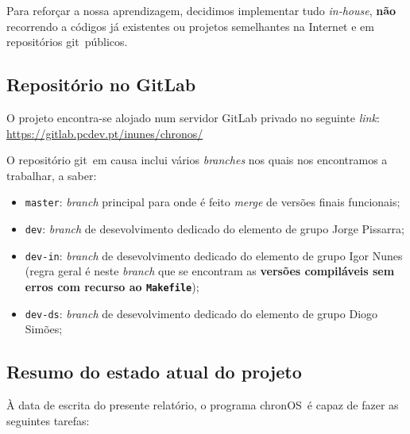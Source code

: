 \documentclass[a4paper,11pt,onecolumn,oneside]{article}
\newcommand{\chronOS}{\textsf{chronOS}}
\newcommand{\git}{\textsf{git}}
\begin{document}
	Para reforçar a nossa aprendizagem, decidimos implementar tudo \textit{in-house}, \textbf{não} recorrendo a códigos já existentes ou projetos semelhantes na Internet e em repositórios \git~públicos.
	
	
	\subsection{Repositório no GitLab}
	\label{ssec:dev:gitlab}
	
	O projeto encontra-se alojado num servidor GitLab privado no seguinte \textit{link}: \url{https://gitlab.pcdev.pt/inunes/chronos/}
	
	O repositório \git~em causa inclui vários \textit{branches} nos quais nos encontramos a trabalhar, a saber:
	
	\begin{itemize}
		\item \texttt{master}: \textit{branch} principal para onde é feito \textit{merge} de versões finais funcionais;
		\item \texttt{dev}: \textit{branch} de desevolvimento dedicado do elemento de grupo Jorge Pissarra;
		\item \texttt{dev-in}: \textit{branch} de desevolvimento dedicado do elemento de grupo Igor Nunes (regra geral é neste \textit{branch} que se encontram as \textbf{versões compiláveis sem erros com recurso ao \texttt{Makefile}});
		\item \texttt{dev-ds}: \textit{branch} de desevolvimento dedicado do elemento de grupo Diogo Simões;
	\end{itemize}
	

	\subsection{Resumo do estado atual do projeto}
	\label{ssec:dev:summary}
	
	À data de escrita do presente relatório, o programa \chronOS~é capaz de fazer as seguintes tarefas:
	
\end{document}
